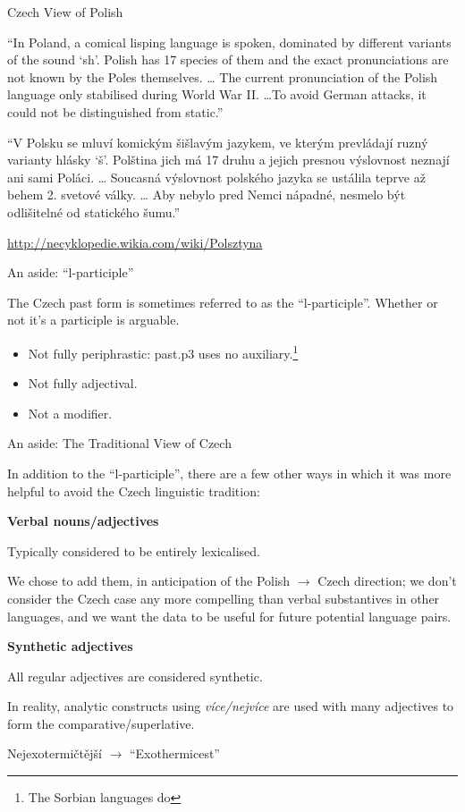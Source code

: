 \documentclass{beamer}
\begin{document}
\begin{frame}{Czech View of Polish}

\begin{center}
``In Poland, a comical lisping language is spoken, dominated by different 
variants of the sound `sh'. Polish has 17 species of them and the exact 
pronunciations are not known by the Poles themselves. \ldots
The current pronunciation of the Polish language only stabilised during 
World War II. \ldots To avoid German attacks, it could not be distinguished 
from static.''
\end{center}

\hbox{}

{\footnotesize
``V Polsku se mluví komickým šišlavým jazykem, ve kterým prevládají ruzný 
varianty hlásky `š'. Polština jich má 17 druhu a jejich presnou výslovnost 
neznají ani sami Poláci. \ldots
Soucasná výslovnost polského jazyka se ustálila teprve až behem 2. svetové 
války.
\ldots
Aby nebylo pred Nemci nápadné, nesmelo být odlišitelné od statického šumu.''}

\url{http://necyklopedie.wikia.com/wiki/Polsztyna}

\end{frame}

\begin{frame}{An aside: ``l-participle''}

The Czech past form is sometimes referred to as the ``l-participle''.
Whether or not it's a participle is arguable.

\begin{itemize}
\item Not fully periphrastic: past.p3 uses no auxiliary.\footnote{The Sorbian languages do}
\item Not fully adjectival.
\item Not a modifier.
\end{itemize}
\end{frame}

\begin{frame}{An aside: The Traditional View of Czech}

In addition to the ``l-participle'', there are a few other
ways in which it was more helpful to avoid the Czech linguistic
tradition:

\textbf{Verbal nouns/adjectives}

Typically considered to be entirely lexicalised.

We chose to add them, in anticipation of the Polish $\rightarrow$ Czech
direction; we don't consider the Czech case any more compelling
than verbal substantives in other languages, and we want the data
to be useful for future potential language pairs.

\textbf{Synthetic adjectives}

All regular adjectives are considered synthetic.

In reality, analytic constructs using \emph{více/nejvíce} are
used with many adjectives to form the comparative/superlative.

Nejexotermičtější $\rightarrow$ ``Exothermicest''
\end{frame}
\end{document}
